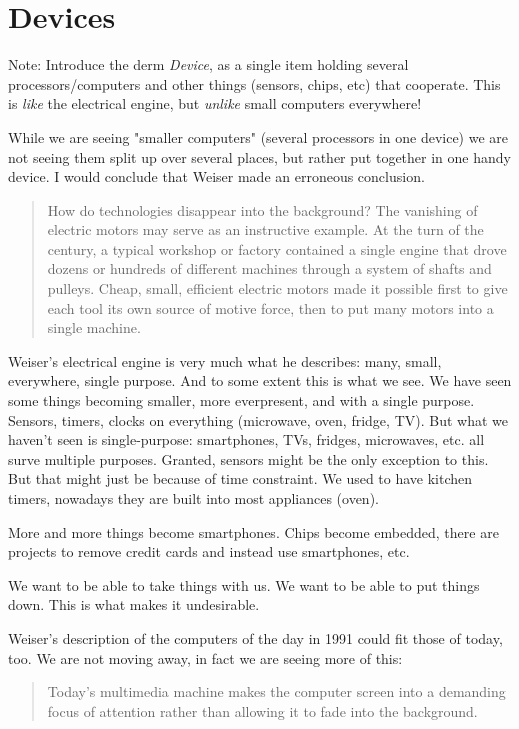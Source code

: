 \section{Devices}

Note: Introduce the derm \emph{Device}, as a single item holding several processors/computers and other things (sensors, chips,
etc) that cooperate. This is \emph{like} the electrical engine, but \emph{unlike} small computers everywhere!

While we are seeing "smaller computers" (several processors in one device) we are not seeing them split up over several places,
but rather put together in one handy device. I would conclude that Weiser made an erroneous conclusion.

\begin{quote}
    How do technologies disappear into the background? The vanishing of electric motors may serve as an instructive example.
    At the turn of the century, a typical workshop or factory contained a single engine that drove dozens or hundreds of
    different machines through a system of shafts and pulleys. Cheap, small, efficient electric motors made it possible first
    to give each tool its own source of motive force, then to put many motors into a single machine.\cite{weiser91}
\end{quote}

Weiser's electrical engine is very much what he describes: many, small, everywhere, single purpose. And to some extent
this is what we see. We have seen some things becoming smaller, more everpresent, and with a single purpose. Sensors, timers,
clocks on everything (microwave, oven, fridge, TV). But what we haven't seen is single-purpose: smartphones, TVs, fridges,
microwaves, etc. all surve multiple purposes. Granted, sensors might be the only exception to this. But that might just 
be because of time constraint. We used to have kitchen timers, nowadays they are built into most appliances (oven).

More and more things become smartphones. Chips become embedded, there are projects to remove credit cards and instead use
smartphones, etc.

We want to be able to take things with us. We want to be able to put things down. This is what makes it undesirable.

Weiser's description of the computers of the day in 1991 could fit those of today, too. We are not moving away, in fact we are
seeing more of this:

\begin{quote}
    Today's multimedia machine makes the computer screen into a demanding focus of attention rather than allowing it to fade
    into the background.\cite{weiser91}
\end{quote}
